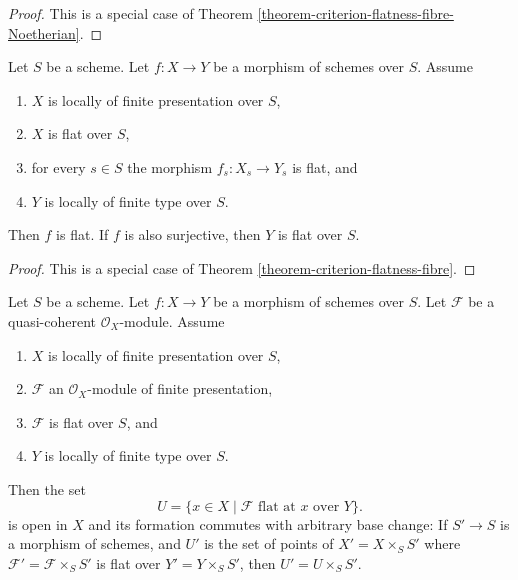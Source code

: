 \begin{proof}
This is a special case of
Theorem \ref{theorem-criterion-flatness-fibre-Noetherian}.
\end{proof}

\begin{lemma}
\label{lemma-morphism-between-flat}
Let $S$ be a scheme.
Let $f : X \to Y$ be a morphism of schemes over $S$.
Assume
\begin{enumerate}
\item $X$ is locally of finite presentation over $S$,
\item $X$ is flat over $S$,
\item for every $s \in S$ the morphism
$f_s : X_s \to Y_s$ is flat, and
\item $Y$ is locally of finite type over $S$.
\end{enumerate}
Then $f$ is flat. If $f$ is also surjective, then $Y$ is flat over $S$.
\end{lemma}

\begin{proof}
This is a special case of
Theorem \ref{theorem-criterion-flatness-fibre}.
\end{proof}

\begin{lemma}
\label{lemma-base-change-criterion-flatness-fibre}
Let $S$ be a scheme. Let $f : X \to Y$ be a morphism of schemes over $S$.
Let $\mathcal{F}$ be a quasi-coherent $\mathcal{O}_X$-module.
Assume
\begin{enumerate}
\item $X$ is locally of finite presentation over $S$,
\item $\mathcal{F}$ an $\mathcal{O}_X$-module of finite presentation,
\item $\mathcal{F}$ is flat over $S$, and
\item $Y$ is locally of finite type over $S$.
\end{enumerate}
Then the set
$$
U = \{x \in X \mid \mathcal{F} \text{ flat at }x \text{ over }Y\}.
$$
is open in $X$ and its formation commutes with arbitrary base change:
If $S' \to S$ is a morphism of schemes, and $U'$ is the set of points
of $X' = X \times_S S'$ where $\mathcal{F}' = \mathcal{F} \times_S S'$
is flat over $Y' = Y \times_S S'$, then $U' = U \times_S S'$.
\end{lemma}

